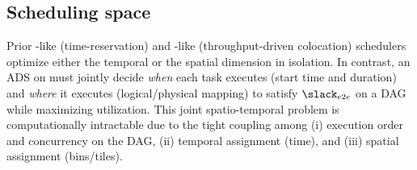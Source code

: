 \subsection{Scheduling space}
Prior \CyclicName-like (time-reservation) and \TpFirstName-like (throughput-driven colocation) schedulers optimize either the temporal or the spatial dimension in isolation. 
In contrast, an ADS on \hwname must jointly decide \emph{when} each task executes (start time and duration) and \emph{where} it executes (logical/physical mapping) to satisfy $\slack_{e2e}$ on a DAG while maximizing utilization. This joint spatio-temporal problem is computationally intractable due to the tight coupling among (i) execution order and concurrency on the DAG, (ii) temporal assignment (time), and (iii) spatial assignment (bins/tiles). 

